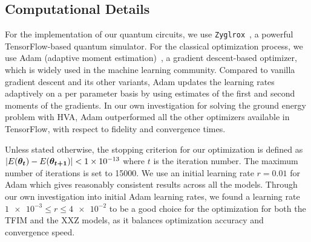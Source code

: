 \documentclass[
 aps,
 pra,
 showpacs,
 showkeys,
 superscriptaddress,
 reprint,%
twocolumn,
]{revtex4-1}
\begin{document}



\begin{appendices}

\section{Computational Details \label{app:compdet}}
For the implementation of our quantum circuits, we use \texttt{Zyglrox}~\cite{Wiersema2020zyglrox}, a powerful TensorFlow-based quantum simulator. For the classical optimization process, we use Adam  (adaptive moment estimation)~\cite{Kingma2014}, a gradient descent-based optimizer, which is widely used in the machine learning community. Compared to vanilla gradient descent and its other variants, Adam updates the learning rates adaptively on a per parameter basis by using estimates of the first and second moments of the gradients. In our own investigation for solving the ground energy problem with HVA, Adam outperformed all the other optimizers available in TensorFlow, with respect to fidelity and convergence times.

Unless stated otherwise, the stopping criterion for our optimization is defined as $\abs{E(\bm{\theta_t}) - E(\bm{\theta_{t+1}})} < \num{1e-13}$ where $t$ is the iteration number. The maximum number of iterations is set to 15000. We use an initial learning rate $r=0.01$ for Adam which gives reasonably consistent results across all the models. Through our own investigation into initial Adam learning rates, we found a learning rate $ \num{1e-3} \leq r \leq \num{4e-2}$ to be a good choice for the optimization for both the TFIM and the XXZ models, as it balances optimization accuracy and convergence speed.


\end{appendices}
\end{document}

